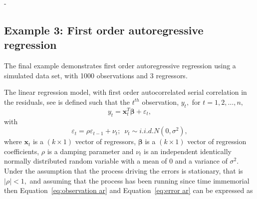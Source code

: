 -\documentclass[article]{jss}
\begin{document}
\subsection{Example 3: First order autoregressive regression}
\label{sub:Example-3:-First}

The final example demonstrates first order autoregressive regression
using a simulated data set, with 1000 observations and 3 regressors.

The linear regression model, with first order autocorrelated serial
correlation in the residuals, see \citet{Zellner1971} is defined such
that the $t^{th}$ observation, $y_{t},$ for
$t=1,2,\dots,n,$
\begin{equation}
  y_{t}=\bm{x}_{t}^{T}\bm{\beta}+\varepsilon_{t},\label{eq:observation
    ar}
\end{equation} 
with
\begin{equation}
  \varepsilon_{t}=\rho\varepsilon_{t-1}+\nu_{t};\,\,\,\nu_{t}\sim
  i.i.d.N(0,\sigma^{2}),
\label{eq:error ar}
\end{equation} where
\textbf{$\bm{x}_{t}$} is a $\left(k\times1\right)$ vector of
regressors, $\bm{\beta}$ is a $\left(k\times1\right)$ vector of
regression coefficients, $\rho$ is a damping parameter and $\nu_{t}$
is an independent identically normally distributed random variable
with a mean of 0 and a variance of $\sigma^{2}.$ Under the assumption
that the process driving the errors is stationary, that is $|\rho|<1,$
and assuming that the process has been running since time immemorial
then Equation~\ref{eq:observation ar} and Equation~\ref{eq:error ar} can be
expressed as
\end{document}
